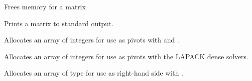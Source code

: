 \documentclass[letterpaper,10pt,english]{sphinxmanual}
\begin{document}

\begin{fulllineitems}
\label{linear_solvers/DLS:c.DestroyMat}
Frees memory for a {\hyperref[linear_solvers/DLS:c.DlsMat]{\emph{}}} matrix

\end{fulllineitems}


\begin{fulllineitems}
\label{linear_solvers/DLS:c.PrintMat}
Prints a {\hyperref[linear_solvers/DLS:c.DlsMat]{\emph{}}} matrix to standard output.

\end{fulllineitems}


\begin{fulllineitems}
\label{linear_solvers/DLS:c.NewLintArray}
Allocates an array of  integers for use as pivots with
{\hyperref[linear_solvers/DLS:c.DenseGETRF]{\emph{}}} and .

\end{fulllineitems}


\begin{fulllineitems}
\label{linear_solvers/DLS:c.NewIntArray}
Allocates an array of  integers for use as pivots with the
LAPACK dense solvers.

\end{fulllineitems}


\begin{fulllineitems}
\label{linear_solvers/DLS:c.NewRealArray}
Allocates an array of type  for use as right-hand side
with .

\end{fulllineitems}
\end{document}
